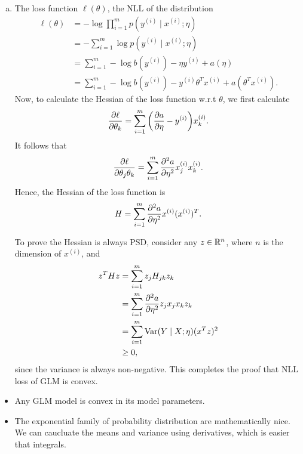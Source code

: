 \documentclass[12pt,letterpaper,boxed]{hmcpset}
\newcommand{\yy}{y^{(i)}}
\newcommand{\xx}{x^{(i)}}
\begin{document}
\begin{solution}
\begin{enumerate}[(a)]
    \item The loss function $\ell(\theta)$, the NLL of the distribution
    \[
    \begin{aligned}
      \ell(\theta) &= - \log \prod_{i=1}^m p(\yy \mid \xx ; \eta) \\
      &= - \sum_{i=1}^{m} \log p(\yy \mid \xx ; \eta) \\
      &= \sum_{i=1}^{m} - \log b(\yy) - \eta \yy + a(\eta) \\
      &= \sum_{i=1}^{m} - \log b(\yy) - \yy \theta^T \xx + a(\theta^T \xx).
    \end{aligned}
    \]
    Now, to calculate the Hessian of the loss function w.r.t $\theta$, we first calculate
    \[
    \begin{aligned}
      \pdv{\ell}{\theta_k} = \sum_{i=1}^m \qty(\pdv{a}{\eta} - \yy) \xx_k.
    \end{aligned}
    \]
    It follows that
    \[
    \pdv{\ell}{\theta_j \theta_k} = \sum_{i=1}^m \pdv[2]{a}{\eta} \xx_j \xx_k.
    \]
    Hence, the Hessian of the loss function is 
    \[
    H = \sum_{i=1}^m \pdv[2]{a}{\eta} \xx (\xx)^T.
    \]

    To prove the Hessian is always PSD, consider any $z \in \mathbb{R}^n$, where $n$ is the dimension of $\xx$, and
    \[
    \begin{aligned}
      z^T H z &= \sum_{i=1}^m z_j H_{jk} z_k \\
      &= \sum_{i=1}^m \pdv[2]{a}{\eta} z_j x_j x_k z_k \\
      &= \sum_{i=1}^m \operatorname{Var}(Y \mid X; \eta) (x^T z)^2 \\
      &\geq 0,
    \end{aligned}
    \]
    since the variance is always non-negative. This completes the proof that NLL loss of GLM is convex.
  \end{enumerate}
\end{solution}

\begin{remark}
  \begin{itemize}
    \item Any GLM model is convex in its model parameters.
    \item The exponential family of probability distribution are mathematically nice. We can caucluate the means and variance using derivatives, which is easier that integrals.
  \end{itemize}
\end{remark}
\end{document}
